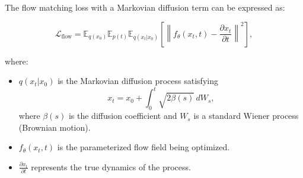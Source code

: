 \documentclass{article}
\begin{document}
The flow matching loss with a Markovian diffusion term can be expressed as:

\[
\mathcal{L}_{\text{flow}} = \mathbb{E}_{q(x_0)} \mathbb{E}_{p(t)} \mathbb{E}_{q(x_t | x_0)} \left[ \left\| f_\theta(x_t, t) - \frac{\partial x_t}{\partial t} \right\|^2 \right],
\]

where:
\begin{itemize}
    \item \( q(x_t | x_0) \) is the Markovian diffusion process satisfying
    \[
    x_t = x_0 + \int_0^t \sqrt{2\beta(s)} \, dW_s,
    \]
    where \( \beta(s) \) is the diffusion coefficient and \( W_s \) is a standard Wiener process (Brownian motion).
    \item \( f_\theta(x_t, t) \) is the parameterized flow field being optimized.
    \item \( \frac{\partial x_t}{\partial t} \) represents the true dynamics of the process.
\end{itemize}
\end{document}

